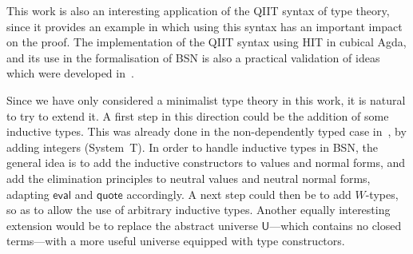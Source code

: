 \documentclass[a4paper,UKenglish,cleveref]{lipics-v2019}
\newcommand{\agdaSymb}[1]{\mathsf{#1}}
\newcommand{\eval}{\agdaSymb{eval}}
\newcommand{\q}{\agdaSymb{quote}}
\newcommand{\U}{\agdaSymb{U}}
\begin{document}
This work is also an interesting application of the QIIT syntax of type theory,
since it provides an example in which using this syntax has an important impact
on the proof. The implementation of the QIIT syntax using HIT in cubical Agda,
and its use in the formalisation of BSN is also a practical validation of
ideas which were developed in~\cite{kaposi2016type}.

Since we have only considered a minimalist type theory in this work, it is
natural to try to extend it.
A first step in this direction could be the addition of some inductive types.
This was already done in the non-dependently typed case
in~\cite{chapman2009bsn}, by adding integers (System~T).
In order to handle inductive types in BSN, the general idea is to add the
inductive constructors to values and normal forms, and add the elimination principles to
neutral values and neutral normal forms, adapting $\eval$ and $\q$ accordingly.
A next step could then be to add $W$-types, so as to allow the use of
arbitrary inductive types.
Another equally interesting extension would be to replace the abstract
universe $\U$---which contains no closed terms---with a more useful universe
equipped with type constructors.


\end{document}
